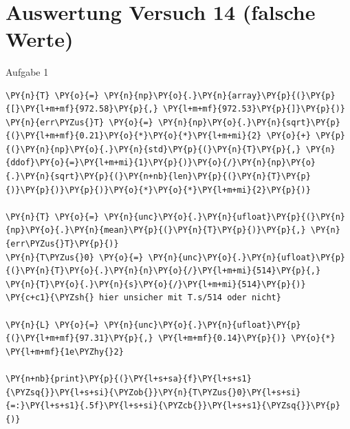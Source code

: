     \begin{center}
    \end{center}
    { \hspace*{\fill} \\}
    
    \hypertarget{auswertung-versuch-14}{%
\section{Auswertung Versuch 14 (falsche Werte) }\label{auswertung-versuch-14}}

    Aufgabe 1

    \begin{tcolorbox}[breakable, size=fbox, boxrule=1pt, pad at break*=1mm,colback=cellbackground, colframe=cellborder]
\begin{Verbatim}[commandchars=\\\{\}]
\PY{n}{T} \PY{o}{=} \PY{n}{np}\PY{o}{.}\PY{n}{array}\PY{p}{(}\PY{p}{[}\PY{l+m+mf}{972.58}\PY{p}{,} \PY{l+m+mf}{972.53}\PY{p}{]}\PY{p}{)}
\PY{n}{err\PYZus{}T} \PY{o}{=} \PY{n}{np}\PY{o}{.}\PY{n}{sqrt}\PY{p}{(}\PY{l+m+mf}{0.21}\PY{o}{*}\PY{o}{*}\PY{l+m+mi}{2} \PY{o}{+} \PY{p}{(}\PY{n}{np}\PY{o}{.}\PY{n}{std}\PY{p}{(}\PY{n}{T}\PY{p}{,} \PY{n}{ddof}\PY{o}{=}\PY{l+m+mi}{1}\PY{p}{)}\PY{o}{/}\PY{n}{np}\PY{o}{.}\PY{n}{sqrt}\PY{p}{(}\PY{n+nb}{len}\PY{p}{(}\PY{n}{T}\PY{p}{)}\PY{p}{)}\PY{p}{)}\PY{o}{*}\PY{o}{*}\PY{l+m+mi}{2}\PY{p}{)}

\PY{n}{T} \PY{o}{=} \PY{n}{unc}\PY{o}{.}\PY{n}{ufloat}\PY{p}{(}\PY{n}{np}\PY{o}{.}\PY{n}{mean}\PY{p}{(}\PY{n}{T}\PY{p}{)}\PY{p}{,} \PY{n}{err\PYZus{}T}\PY{p}{)}
\PY{n}{T\PYZus{}0} \PY{o}{=} \PY{n}{unc}\PY{o}{.}\PY{n}{ufloat}\PY{p}{(}\PY{n}{T}\PY{o}{.}\PY{n}{n}\PY{o}{/}\PY{l+m+mi}{514}\PY{p}{,} \PY{n}{T}\PY{o}{.}\PY{n}{s}\PY{o}{/}\PY{l+m+mi}{514}\PY{p}{)}
\PY{c+c1}{\PYZsh{} hier unsicher mit T.s/514 oder nicht}

\PY{n}{L} \PY{o}{=} \PY{n}{unc}\PY{o}{.}\PY{n}{ufloat}\PY{p}{(}\PY{l+m+mf}{97.31}\PY{p}{,} \PY{l+m+mf}{0.14}\PY{p}{)} \PY{o}{*} \PY{l+m+mf}{1e\PYZhy{}2}

\PY{n+nb}{print}\PY{p}{(}\PY{l+s+sa}{f}\PY{l+s+s1}{\PYZsq{}}\PY{l+s+si}{\PYZob{}}\PY{n}{T\PYZus{}0}\PY{l+s+si}{=:}\PY{l+s+s1}{.5f}\PY{l+s+si}{\PYZcb{}}\PY{l+s+s1}{\PYZsq{}}\PY{p}{)}
\end{Verbatim}
\end{tcolorbox}

